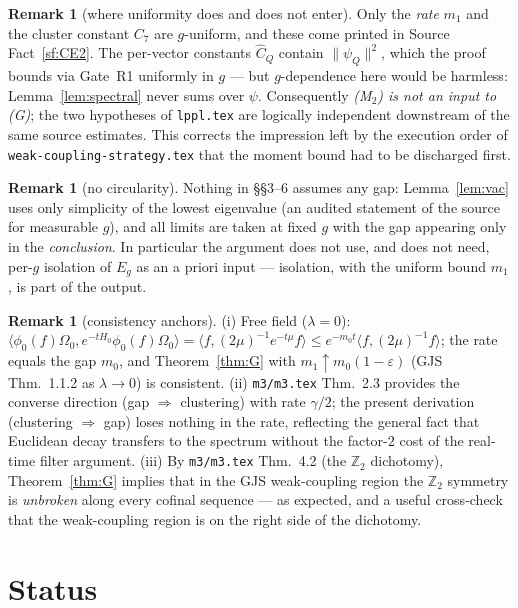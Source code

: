 \documentclass[11pt,a4paper]{article}
\theoremstyle{plain}
\theoremstyle{definition}
\newtheorem{remark}[theorem]{Remark}
\newcommand{\Om}{\Omega}
\newcommand{\ip}[2]{\langle #1,#2\rangle}
\begin{document}
\begin{remark}[where uniformity does and does not enter]\label{rem:unif}
Only the \emph{rate} $m_1$ and the cluster constant $C_7$ are $g$-uniform, and these come printed
in Source Fact~\ref{sf:CE2}. The per-vector constants $\widehat C_Q$ contain
$\|\psi_Q\|^2$, which the proof bounds via Gate~R1 uniformly in $g$ --- but $g$-dependence here
would be harmless: Lemma~\ref{lem:spectral} never sums over $\psi$. Consequently \emph{(M$_2$) is
not an input to (G)}; the two hypotheses of \texttt{lppl.tex} are logically independent
downstream of the same source estimates. This corrects the impression left by the execution order
of \texttt{weak-coupling-strategy.tex} that the moment bound had to be discharged first.
\end{remark}

\begin{remark}[no circularity]\label{rem:circ}
Nothing in \S\S3--6 assumes any gap: Lemma~\ref{lem:vac} uses only simplicity of the lowest
eigenvalue (an audited statement of the source for measurable $g$), and all limits are taken at
fixed $g$ with the gap appearing only in the \emph{conclusion}. In particular the argument does
not use, and does not need, per-$g$ isolation of $E_g$ as an a priori input --- isolation, with
the uniform bound $m_1$, is part of the output.
\end{remark}

\begin{remark}[consistency anchors]\label{rem:anchor}
(i) Free field ($\lambda=0$): $\ip{\phi_0(f)\Om_0}{e^{-tH_0}\phi_0(f)\Om_0}
=\ip{f}{(2\mu)^{-1}e^{-t\mu}f}\le e^{-m_0t}\ip{f}{(2\mu)^{-1}f}$; the rate equals the gap $m_0$,
and Theorem~\ref{thm:G} with $m_1\uparrow m_0(1-\varepsilon)$ (GJS Thm.~1.1.2 as $\lambda\to0$) is
consistent. (ii) \texttt{m3/m3.tex} Thm.~2.3 provides the converse direction (gap $\Rightarrow$
clustering) with rate $\gamma/2$; the present derivation (clustering $\Rightarrow$ gap) loses
nothing in the rate, reflecting the general fact that Euclidean decay transfers to the spectrum
without the factor-$2$ cost of the real-time filter argument.
(iii) By \texttt{m3/m3.tex} Thm.~4.2 (the $\mathbb Z_2$ dichotomy), Theorem~\ref{thm:G} implies
that in the GJS weak-coupling region the $\mathbb Z_2$ symmetry is \emph{unbroken} along every
cofinal sequence --- as expected, and a useful cross-check that the weak-coupling region is on
the right side of the dichotomy.
\end{remark}

\section{Status}
\end{document}
